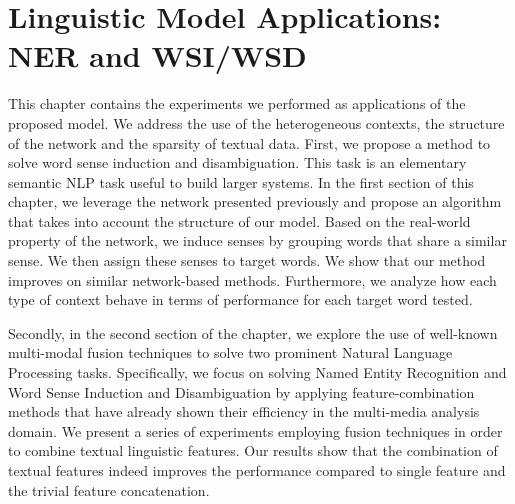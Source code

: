 \chapter{Linguistic Model Applications: NER and WSI/WSD} 
\label{chap:wsd}
\begin{abstractchap}
This chapter contains the experiments we performed as applications of the proposed model. We address the use of the heterogeneous contexts, the structure of the network and the sparsity of textual data.
First, we propose a method to solve word sense induction and disambiguation. This task is an elementary semantic NLP task useful to build larger systems. In the first section of this chapter, we leverage the network presented previously and propose an algorithm that takes into account the structure of our model. Based on the real-world property of the network, we induce senses by grouping words that share a similar sense. We then assign these senses to target words. We show that our method improves on similar network-based methods. Furthermore, we analyze how each type of context behave in terms of performance for each target word tested.

Secondly, in the second section of the chapter, we explore the use of well-known multi-modal fusion techniques to solve two prominent Natural Language Processing tasks. Specifically, we focus on solving Named Entity Recognition and Word Sense Induction and Disambiguation by applying feature-combination methods that have already shown their efficiency in the multi-media analysis domain. We present a series of experiments employing fusion techniques in order to combine textual linguistic features. Our results show that the combination of textual features indeed improves the performance compared to single feature and the trivial feature concatenation. 

\end{abstractchap}

\minitoc
